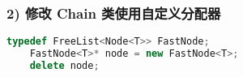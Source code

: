 \documentclass[UTF8]{ctexart}
\begin{document}
\subsubsection*{2) 修改 Chain 类使用自定义分配器}

\begin{lstlisting}[language=C++]
	typedef FreeList<Node<T>> FastNode;
	FastNode<T>* node = new FastNode<T>;
	delete node;
\end{lstlisting}
\end{document}
